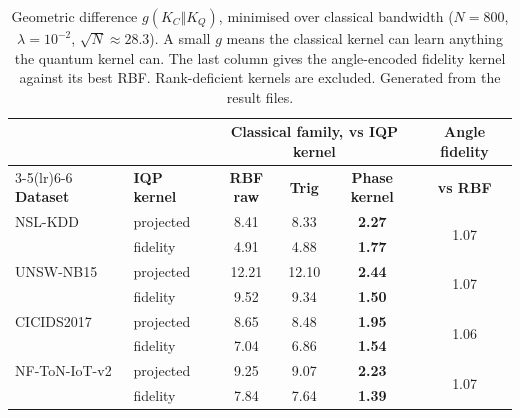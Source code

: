 \begin{table}[t]
\centering
\caption{Geometric difference $g(K_C\Vert K_Q)$, minimised over classical bandwidth
($N=800$, $\lambda=10^{-2}$, $\sqrt{N}\approx 28.3$). A small $g$ means the
classical kernel can learn anything the quantum kernel can. The last column gives the angle-encoded
fidelity kernel against its best RBF. Rank-deficient kernels are excluded. Generated from the result
files.}
\label{tab:geom}
\footnotesize
\renewcommand{\arraystretch}{1.15}
\setlength{\tabcolsep}{3pt}
\begin{tabular}{@{}llcccc@{}}
\toprule
& & \multicolumn{3}{c}{\textbf{Classical family, vs IQP kernel}} & \textbf{Angle fidelity}\\
\cmidrule(lr){3-5}\cmidrule(lr){6-6}
\textbf{Dataset} & \textbf{IQP kernel} & \textbf{RBF raw} & \textbf{Trig} & \textbf{Phase kernel} & \textbf{vs RBF}\\
\midrule
NSL-KDD & projected & 8.41 & 8.33 & \textbf{2.27} & \multirow{2}{*}{1.07}\\
 & fidelity & 4.91 & 4.88 & \textbf{1.77} & \\
UNSW-NB15 & projected & 12.21 & 12.10 & \textbf{2.44} & \multirow{2}{*}{1.07}\\
 & fidelity & 9.52 & 9.34 & \textbf{1.50} & \\
CICIDS2017 & projected & 8.65 & 8.48 & \textbf{1.95} & \multirow{2}{*}{1.06}\\
 & fidelity & 7.04 & 6.86 & \textbf{1.54} & \\
NF-ToN-IoT-v2 & projected & 9.25 & 9.07 & \textbf{2.23} & \multirow{2}{*}{1.07}\\
 & fidelity & 7.84 & 7.64 & \textbf{1.39} & \\
\bottomrule
\end{tabular}
\end{table}
